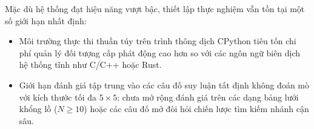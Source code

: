 Mặc dù hệ thống đạt hiệu năng vượt bậc, thiết lập thực nghiệm vẫn tồn tại một số giới hạn nhất định:
\begin{itemize}
    \item Môi trường thực thi thuần túy trên trình thông dịch CPython tiêu tốn chi phí quản lý đối tượng cấp phát động cao hơn so với các ngôn ngữ biên dịch hệ thống tĩnh như C/C++ hoặc Rust.
    \item Giới hạn đánh giá tập trung vào các câu đố suy luận tất định không đoán mò với kích thước tối đa $5 \times 5$; chưa mở rộng đánh giá trên các dạng bảng lưới khổng lồ ($N \ge 10$) hoặc các câu đố mở đòi hỏi chiến lược tìm kiếm nhánh cận sâu.
\end{itemize}
